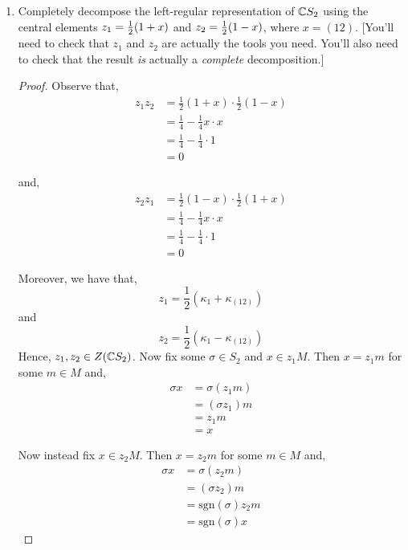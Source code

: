 \documentclass[11pt, reqno]{amsart}
\theoremstyle{plain}
\theoremstyle{definition}
\theoremstyle{example}
\def\half{\hbox{$\frac12$}}
\def\id{\mathrm{id}}
\def\sgn{\mathrm{sgn}}
\begin{document}
\begin{enumerate}[1.]
\begin{proof}
and 
\begin{align*}
\lambda f &= \varphi^{-1} \circ f^{-1} \circ f \circ \varphi\\
&= \id
\end{align*}

Hence, by the Proposition from Lecture 10 part B, we have that our short exact sequence is also split, with $\mu$ and $\lambda$ as the splitting homomorphisms.
\end{proof}

\item Completely decompose the left-regular representation of $\mathbb{C} S_2$ using the central elements $z_1 = \half(1+x)$ and $z_2 = \half(1-x)$, where $x = (12)$. {[You'll need to check that $z_1$ and $z_2$ are actually the tools you need. You'll also need to check that the result \emph{is} actually a \emph{complete} decomposition.]}

\begin{proof}
Observe that,
\begin{align*}
z_1z_2 &= \frac{1}{2}(1+x) \cdot \frac{1}{2}(1-x)\\
&= \frac{1}{4} - \frac{1}{4} x \cdot x\\
&= \frac{1}{4} - \frac{1}{4} \cdot 1\\
&= 0
\end{align*}

and,
\begin{align*}
z_2z_1 &= \frac{1}{2}(1-x) \cdot \frac{1}{2}(1+x)\\
&= \frac{1}{4} - \frac{1}{4} x \cdot x\\
&= \frac{1}{4} - \frac{1}{4} \cdot 1\\
&= 0
\end{align*}

Moreover, we have that, $$z_1 = \frac{1}{2}(\kappa_1 + \kappa_{(12)})$$ and $$z_2 = \frac{1}{2}(\kappa_1 - \kappa_{(12)})$$ Hence, $z_1, z_2 \in Z(\mathbb{C} S_2)$. Now fix some $\sigma \in S_2$ and $x \in z_1M$. Then $x = z_1 m$ for some $m \in M$ and,
\begin{align*}
\sigma x &= \sigma (z_1 m)\\
&= (\sigma z_1)m\\
&= z_1 m\\
&= x
\end{align*}

Now instead fix $x \in z_2 M$. Then $x = z_2 m$ for some $m \in M$ and,
\begin{align*}
\sigma x &= \sigma (z_2 m)\\
&= (\sigma z_2)m\\
&= \sgn(\sigma) z_2 m\\
&= \sgn(\sigma) x
\end{align*}


\end{proof}
\end{enumerate}
\end{document}
